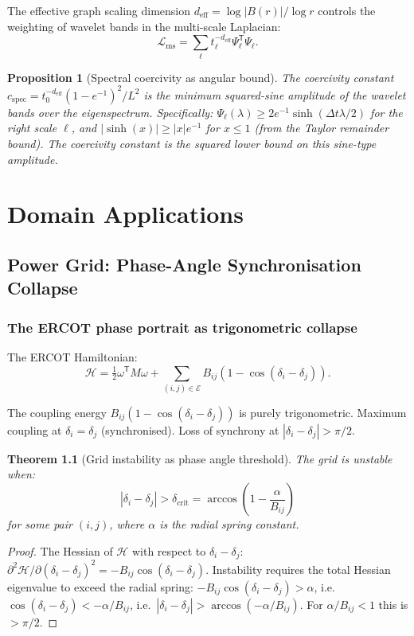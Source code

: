 \documentclass[11pt,a4paper,openany]{book}
\newtheorem{theorem}{Theorem}[chapter]
\newtheorem{proposition}[theorem]{Proposition}
\theoremstyle{definition}
\newcommand{\T}{^{\mathsf{T}}}
\newcommand{\half}{\tfrac{1}{2}}
\begin{document}
The effective graph scaling dimension $d_\mathrm{eff} = \log|B(r)|/\log r$ controls
the weighting of wavelet bands in the multi-scale Laplacian:
\[
\mathcal{L}_\mathrm{ms} = \sum_\ell t_\ell^{-d_\mathrm{eff}}\Psi_\ell\T\Psi_\ell.
\]

\begin{proposition}[Spectral coercivity as angular bound]
The coercivity constant $c_\mathrm{spec} = t_0^{-d_\mathrm{eff}}(1-e^{-1})^2/L^2$
is the minimum squared-sine amplitude of the wavelet bands over the eigenspectrum.
Specifically: $\Psi_\ell(\lambda) \geq 2e^{-1}\sinh(\Delta t\lambda/2)$ for the right scale $\ell$,
and $|\sinh(x)| \geq |x|e^{-1}$ for $x \leq 1$ (from the Taylor remainder bound).
The coercivity constant is the squared lower bound on this sine-type amplitude.
\end{proposition}

\part{Domain Applications}

\chapter{Power Grid: Phase-Angle Synchronisation Collapse}

\section{The ERCOT phase portrait as trigonometric collapse}

The ERCOT Hamiltonian:
\[
\mathcal{H} = \half\omega\T M\omega + \sum_{(i,j)\in\mathcal{E}} B_{ij}(1-\cos(\delta_i-\delta_j)).
\]

The coupling energy $B_{ij}(1-\cos(\delta_i-\delta_j))$ is purely trigonometric.
Maximum coupling at $\delta_i = \delta_j$ (synchronised). Loss of synchrony at $|\delta_i-\delta_j| > \pi/2$.

\begin{theorem}[Grid instability as phase angle threshold]
The grid is unstable when:
\[
|\delta_i - \delta_j| > \delta_\mathrm{crit} = \arccos\!\left(1 - \frac{\alpha}{B_{ij}}\right)
\]
for some pair $(i,j)$, where $\alpha$ is the radial spring constant.
\end{theorem}

\begin{proof}
The Hessian of $\mathcal{H}$ with respect to $\delta_i - \delta_j$:
$\partial^2\mathcal{H}/\partial(\delta_i-\delta_j)^2 = -B_{ij}\cos(\delta_i-\delta_j)$.
Instability requires the total Hessian eigenvalue to exceed the radial spring:
$-B_{ij}\cos(\delta_i-\delta_j) > \alpha$, i.e.\
$\cos(\delta_i-\delta_j) < -\alpha/B_{ij}$, i.e.\
$|\delta_i-\delta_j| > \arccos(-\alpha/B_{ij})$. For $\alpha/B_{ij} < 1$ this is $> \pi/2$.
\end{proof}
\end{document}
